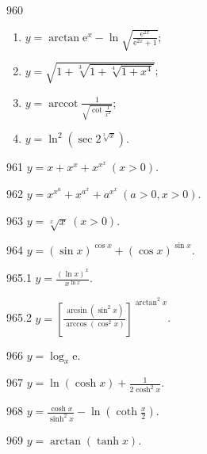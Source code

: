 \begin{prob}[L]{960}
\begin{enumerate}[label=(\alph*), itemsep=2pt, topsep=3pt]
\item $y = \arctan \mathrm{e}^x - \ln \sqrt{\frac{\mathrm{e}^{2x}}{\mathrm{e}^{2x} + 1}}$;
\item $y = \sqrt{1 + \sqrt[3]{1 + \sqrt[4]{1 + x^4}}}$;
\item $y = \operatorname{arccot} \frac{1}{\sqrt{\cot \frac{1}{x^2}}}$;
\item $y = \ln^2(\sec 2^{\sqrt[3]{x}})$.
\end{enumerate}
\end{prob}

\begin{prob}[S]{961}
$y = x + x^x + x^{x^x} \ (x > 0)$.
\end{prob}

\begin{prob}[S]{962}
$y = x^{x^a} + x^{a^x} + a^{x^x} \ (a > 0, x > 0)$.
\end{prob}

\begin{prob}[S]{963}
$y = \sqrt[x]{x} \ (x > 0)$.
\end{prob}

\begin{prob}[S]{964}
$y = (\sin x)^{\cos x} + (\cos x)^{\sin x}$.
\end{prob}

\begin{prob}[S]{965.1}
$y = \frac{(\ln x)^x}{x^{\ln x}}$.
\end{prob}

\begin{prob}[S]{965.2}
$y = \left[ \frac{\arcsin(\sin^2 x)}{\arccos(\cos^2 x)} \right]^{\arctan^2 x}$.
\end{prob}

\begin{prob}[S]{966}
$y = \log_x \mathrm{e}$.
\end{prob}

\begin{prob}[S]{967}
$y = \ln(\cosh x) + \frac{1}{2\cosh^2 x}$.
\end{prob}

\begin{prob}[S]{968}
$y = \frac{\cosh x}{\sinh^2 x} - \ln\left(\coth \frac{x}{2}\right)$.
\end{prob}

\begin{prob}[S]{969}
$y = \arctan(\tanh x)$.
\end{prob}

